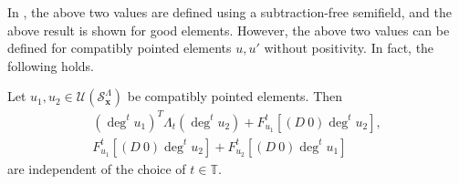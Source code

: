 In \cite{Cao}, the above two values are defined using
a subtraction-free semifield, and the above result is shown
for good elements.
However, the above two values can be defined for compatibly pointed
elements $u, u'$ without positivity.
In fact, the following holds.

\begin{Prop}
\label{Prop : tropical invariants of compatibly pointed elements}
Let $u_1, u_2 \in \mathcal{U}(\mathcal{S}_{\mathbf{x}}^{\Lambda})$
be compatibly pointed elements.
Then
\[
\begin{gathered}
(\deg^t u_1)^T\Lambda_t(\deg^t u_2)
+ F_{u_1}^t[(D\ 0)\deg^t u_2], \\
F_{u_1}^t[(D\ 0)\deg^t u_2]
+ F_{u_2}^t[(D\ 0)\deg^t u_1]
\end{gathered}
\]
are independent of the choice of $t \in \mathbb{T}$.
\end{Prop}

